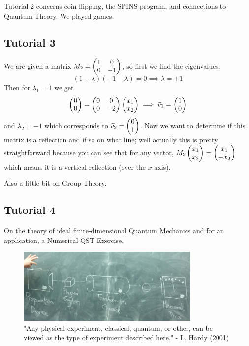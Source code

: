 \documentclass[english, 11pt]{article}
\begin{document}
      Tutorial 2 concerns coin flipping, the SPINS program, and connections to Quantum Theory. We played games.

     \subsection{Tutorial 3}

      We are given a matrix $M_2 = \left(\begin{matrix}1 & 0 \\ 0 & -1\end{matrix}\right)$, so first we find the eigenvalues:
      \[ (1-\lambda)(-1 - \lambda) = 0 \implies \lambda = \pm 1 \]
      Then for $\lambda_1 = 1$ we get
      \[ \left(\begin{matrix}0\\0\end{matrix}\right) = \left(\begin{matrix}0 & 0 \\ 0 & -2\end{matrix}\right)\left(\begin{matrix}x_1 \\ x_2\end{matrix}\right) \implies {\vec{v}}_1 = \left(\begin{matrix}1 \\ 0\end{matrix}\right) \]
      and $\lambda_2 = -1$ which corresponds to ${\vec{v}}_2 = \left(\begin{matrix}0 \\ 1\end{matrix}\right)$. Now we want to determine if this matrix is a reflection and if so on what line; well actually this is pretty straightforward because you can see that for any vector, $M_2\left(\begin{matrix}x_1\\x_2\end{matrix}\right) = \left(\begin{matrix}x_1\\-x_2\end{matrix}\right)$ which means it is a vertical reflection (over the $x$-axis).
      \newline

      Also a little bit on Group Theory.

     \subsection{Tutorial 4}

      On the theory of ideal finite-dimensional Quantum Mechanics and for an application, a Numerical QST Exercise.

      \begin{figure}[b!]
            \centering
            \includegraphics[width=0.8\textwidth]{any_physics.png}
            \caption{"Any physical experiment, classical, quantum, or other, can be viewed as the type of experiment described here." - L. Hardy (2001)}
      \end{figure}
\end{document}
